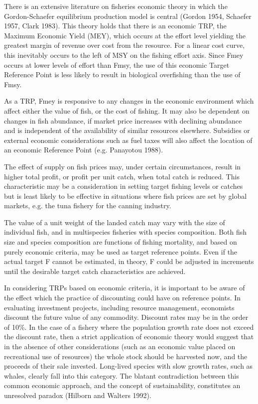 \documentclass[12pt,oneline,a4paper,numbib]{ouparticle}
\begin{document}
There is an extensive literature on fisheries economic theory in which the Gordon-Schaefer equilibrium production model is central (Gordon 1954, Schaefer 1957, Clark 1983). This theory holds that there is an economic TRP, the Maximum Economic Yield (MEY), which occurs at the effort level yielding the greatest margin of revenue over cost from the resource. 
For a linear cost curve, this inevitably occurs to the left of MSY on the fishing effort axis. Since Fmey occurs at lower levels of effort than Fmsy, the use of this economic Target Reference Point is less likely to result in biological overfishing than the use of Fmsy.

As a TRP, Fmey is responsive to any changes in the economic environment which affect either the value of fish, or the cost of fishing. It may also be dependent on changes in fish abundance, if market price increases with declining abundance and is independent of the availability of similar resources elsewhere. Subsidies or external economic considerations such as fuel taxes will also affect the location of an economic Reference Point (e.g. Panayotou 1988).

The effect of supply on fish prices may, under certain circumstances, result in higher total profit, or profit per unit catch, when total catch is reduced. This characteristic may be a consideration in setting target fishing levels or catches but is least likely to be effective in situations where fish prices are set by global markets, e.g. the tuna fishery for the canning industry.

The value of a unit weight of the landed catch may vary with the size of individual fish, and in multispecies fisheries with species composition. Both fish size and species composition are functions of fishing mortality, and based on purely economic criteria, may be used as target reference points. Even if the actual target F cannot be estimated, in theory, F could be adjusted in increments until the desirable target catch characteristics are achieved.

In considering TRPs based on economic criteria, it is important to be aware of the effect which the practice of discounting could have on reference points. In evaluating investment projects, including resource management, economists discount the future value of any commodity. Discount rates may be in the order of 10\%. In the case of a fishery where the population growth rate does not exceed the discount rate, then a strict application of economic theory would suggest that in the absence of other considerations (such as an economic value placed on recreational use of resources) the whole stock should be harvested now, and the proceeds of their sale invested. Long-lived species with slow growth rates, such as whales, clearly fall into this category. The blatant contradiction between this common economic approach, and the concept of sustainability, constitutes an unresolved paradox (Hilborn and Walters 1992).
\end{document}
